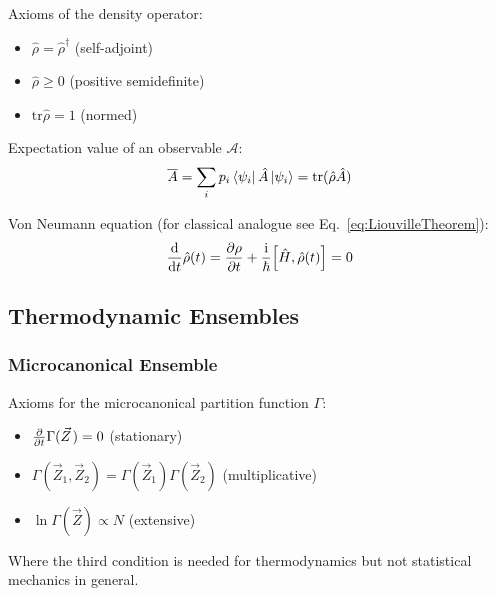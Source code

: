 			\noindent
			Axioms of the density operator:
			\begin{itemize}\itemsep -0pt	%
				\item $\hat{\rho} = \hat{\rho}^\dagger$ \hfill{(self-adjoint)}
				\item $\hat{\rho} \ge 0 $ \hfill{(positive semidefinite)}
				\item $\mathrm{tr} \hat{\rho} = 1$ \hfill{(normed)}
			\end{itemize}

			\noindent
			Expectation value of an observable $\mathcal{A}$:
			\begin{equation}
				\overline{A} = \sum_i p_i \Bra{\psi_i}\hat{A}\Ket{\psi_i} = \mathrm{tr} (\hat{\rho}\hat{A})
			\end{equation}

			\noindent
			Von Neumann equation (for classical analogue see Eq.~\ref{eq:LiouvilleTheorem}):
			\begin{equation}
				\label{eq:VonNeumannEquation}
				\dv{t}\hat{\rho}(t) = \pdv{\rho}{t} + \frac{\i}{\hbar} \comm{\hat{H}}{\hat{\rho}(t)} = 0
			\end{equation}

	\subsection{Thermodynamic Ensembles}
		\subsubsection{Microcanonical Ensemble}
			\noindent
			Axioms for the microcanonical partition function $\Gamma$:
			\begin{itemize}\itemsep -0pt	%
				\item $\pdv{t}\Gamma(\vec{Z}) = 0$ \hfill{(stationary)}
				\item $\Gamma(\vec{Z}_1,\vec{Z}_2) = \Gamma(\vec{Z}_1)\Gamma(\vec{Z}_2) $ \hfill{(multiplicative)}
				\item $\ln\Gamma(\vec{Z}) \propto N$ \hfill{(extensive)}
			\end{itemize}
			Where the third condition is needed for thermodynamics but not statistical mechanics in general.

